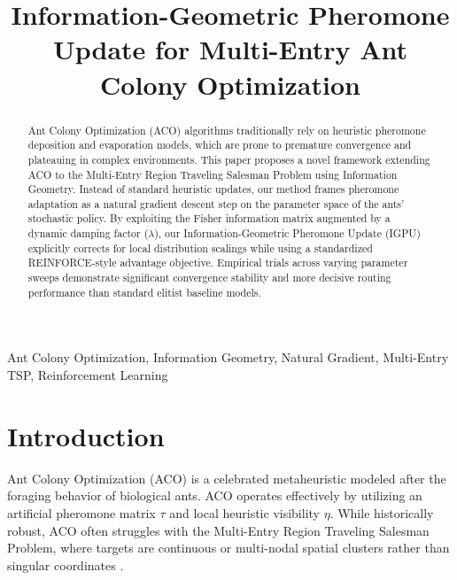 \documentclass[conference]{IEEEtran}
\begin{document}
\title{Information-Geometric Pheromone Update for Multi-Entry Ant Colony Optimization}

\author{
\and
{}
}

\maketitle

\begin{abstract}
Ant Colony Optimization (ACO) algorithms traditionally rely on heuristic pheromone deposition and evaporation models, which are prone to premature convergence and plateauing in complex environments. This paper proposes a novel framework extending ACO to the Multi-Entry Region Traveling Salesman Problem using Information Geometry. Instead of standard heuristic updates, our method frames pheromone adaptation as a natural gradient descent step on the parameter space of the ants' stochastic policy. By exploiting the Fisher information matrix augmented by a dynamic damping factor ($\lambda$), our Information-Geometric Pheromone Update (IGPU) explicitly corrects for local distribution scalings while using a standardized REINFORCE-style advantage objective. Empirical trials across varying parameter sweeps demonstrate significant convergence stability and more decisive routing performance than standard elitist baseline models.
\end{abstract}

\begin{IEEEkeywords}
Ant Colony Optimization, Information Geometry, Natural Gradient, Multi-Entry TSP, Reinforcement Learning
\end{IEEEkeywords}

\section{Introduction}
Ant Colony Optimization (ACO) is a celebrated metaheuristic modeled after the foraging behavior of biological ants. ACO operates effectively by utilizing an artificial pheromone matrix $\tau$ and local heuristic visibility $\eta$. While historically robust, ACO often struggles with the Multi-Entry Region Traveling Salesman Problem, where targets are continuous or multi-nodal spatial clusters rather than singular coordinates \cite{dorigo1996ant}. 
\end{document}
